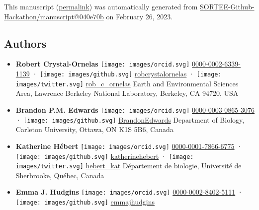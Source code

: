 This manuscript
(\href{https://SORTEE-Github-Hackathon.github.io/manuscript/v/040e70b2b68ac8822e659081c5404a1ed8afe972/}{permalink})
was automatically generated
from \href{https://github.com/SORTEE-Github-Hackathon/manuscript/tree/040e70b2b68ac8822e659081c5404a1ed8afe972}{SORTEE-Github-Hackathon/manuscript@040e70b}
on February 26, 2023.

\hypertarget{authors}{%
\subsection{Authors}\label{authors}}

\begin{itemize}
\item
  \textbf{Robert Crystal-Ornelas}
  \texttt{[image: images/orcid.svg]}
  \href{https://orcid.org/0000-0002-6339-1139}{0000-0002-6339-1139}
  · \texttt{[image: images/github.svg]}
  \href{https://github.com/robcrystalornelas}{robcrystalornelas}
  · \texttt{[image: images/twitter.svg]}
  \href{https://twitter.com/rob_c_ornelas}{rob\_c\_ornelas}
  Earth and Environmental Sciences Area, Lawrence Berkeley National Laboratory, Berkeley, CA 94720, USA
\item
  \textbf{Brandon P.M. Edwards}
  \texttt{[image: images/orcid.svg]}
  \href{https://orcid.org/0000-0003-0865-3076}{0000-0003-0865-3076}
  · \texttt{[image: images/github.svg]}
  \href{https://github.com/BrandonEdwards}{BrandonEdwards}
  Department of Biology, Carleton University, Ottawa, ON K1S 5B6, Canada
\item
  \textbf{Katherine Hébert}
  \texttt{[image: images/orcid.svg]}
  \href{https://orcid.org/0000-0001-7866-6775}{0000-0001-7866-6775}
  · \texttt{[image: images/github.svg]}
  \href{https://github.com/katherinehebert}{katherinehebert}
  · \texttt{[image: images/twitter.svg]}
  \href{https://twitter.com/hebert_kat}{hebert\_kat}
  Département de biologie, Université de Sherbrooke, Québec, Canada
\item
  \textbf{Emma J. Hudgins}
  \texttt{[image: images/orcid.svg]}
  \href{https://orcid.org/0000-0002-8402-5111}{0000-0002-8402-5111}
  · \texttt{[image: images/github.svg]}
  \href{https://github.com/emmajhudgins}{emmajhudgins}

\end{itemize}
